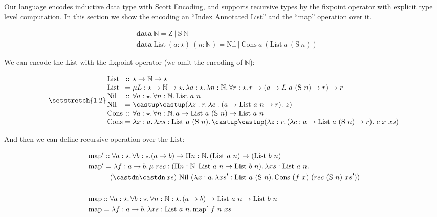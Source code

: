 Our language encodes inductive data type with Scott Encoding, and supports
recursive types by the fixpoint operator with explicit type level computation.
In this section we show the encoding an ``Index Annotated List'' and the ``map''
operation over it.

\newcommand{\Nat}[0]{\mathbb{N}}
\newcommand{\Succ}[0]{\mathrm{S}}
\newcommand{\Zero}[0]{\mathrm{Z}}
\newcommand{\List}[0]{\mathrm{List}}
\newcommand{\Nil}[0]{\mathrm{Nil}}
\newcommand{\Cons}[0]{\mathrm{Cons}}
\newcommand{\map}[0]{\mathrm{map}}

\begin{align*}
  & \mathbf{data} ~ \Nat = \Zero ~|~ \Succ~\Nat \\
  & \mathbf{data} ~ \List~(a : \star)~(n : \Nat) = \Nil ~ | ~ \Cons~a~(\List~a~(\Succ~n))
\end{align*}

We can encode the $\mathrm{List}$ with the fixpoint operator (we omit the encoding of $\Nat$):

\begin{equation*}
\setlength{\arraycolsep}{1.5pt}
\setstretch{1.2}
\begin{array}{lcl}
\List &::& \star \rightarrow \Nat \rightarrow \star \\
\List &=& \mu L : \star \rightarrow \Nat \rightarrow \star.\, \lambda a:\star.\, \lambda n :\Nat.\, \forall r:\star.\, r \rightarrow (a \rightarrow L~a~(\Succ ~ n) \rightarrow r) \rightarrow r \\
\Nil &::& \forall a : \star.\, \forall n : \Nat.\, \List ~ a ~ n \\
\Nil &=& \castup \castup (\lambda z : r.\, \lambda c : (a \rightarrow \List~a~n \rightarrow r). ~ z) \\
\Cons &::& \forall a : \star.\, \forall n : \Nat.\, a \rightarrow \List ~ a ~ (\Succ ~ n) \rightarrow \List ~ a ~n \\
\Cons &=& \lambda x : a.\, \lambda xs : \List~a~(\Succ ~ n).\, \castup \castup (\lambda z : r.\, (\lambda c : a \rightarrow \List~a~(\Succ ~ n) \rightarrow r). ~ c ~ x ~ xs)
\end{array}
\end{equation*}

And then we can define recursive operation over the $\mathrm{List}$:

\begin{align*}
  & \map ' :: \forall a : \star.\, \forall b : \star. (a \rightarrow b) \rightarrow \Pi n : \Nat.\, (\List~a~n) \rightarrow (\List~b~n) \\
  & \map ' = \lambda f : a \rightarrow b.\, \mu ~ rec : (\Pi n : \Nat.\, \List~a~n \rightarrow \List~b~n).\, \lambda xs : \List~a~n. \\
  & \quad\qquad (\castdn \castdn \, xs) ~ \Nil ~ (\lambda x : a.\, \lambda xs' : \List~a~(\Succ~n).\, \Cons ~ (f ~ x) ~ (rec ~ (\Succ~n)~xs')) \\
  \\
  & \map :: \forall a : \star.\, \forall b : \star.\, \forall n : \Nat : \star.\, (a \rightarrow b) \rightarrow \List~a~n \rightarrow \List~b~n \\
  & \map = \lambda f : a \rightarrow b.\, \lambda xs : \List ~ a ~ n.\, \map '~f~n~xs
\end{align*}

